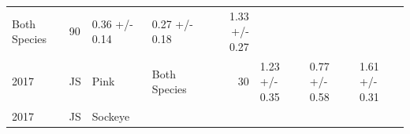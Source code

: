\documentclass[fleqn,10pt]{wlpeerj} %
\begin{document}
\begin{longtable}[]{@{}llllrlll@{}}
\begin{minipage}[t]{0.11\columnwidth}
Both Species\strut
\end{minipage} & \begin{minipage}[t]{0.04\columnwidth}\raggedleft\strut
90\strut
\end{minipage} & \begin{minipage}[t]{0.14\columnwidth}\raggedright\strut
0.36 +/- 0.14\strut
\end{minipage} & \begin{minipage}[t]{0.14\columnwidth}\raggedright\strut
0.27 +/- 0.18\strut
\end{minipage} & \begin{minipage}[t]{0.14\columnwidth}\raggedright\strut
1.33 +/- 0.27\strut
\end{minipage}\tabularnewline
\begin{minipage}[t]{0.09\columnwidth}\raggedright\strut
2017\strut
\end{minipage} & \begin{minipage}[t]{0.06\columnwidth}\raggedright\strut
JS\strut
\end{minipage} & \begin{minipage}[t]{0.06\columnwidth}\raggedright\strut
Pink\strut
\end{minipage} & \begin{minipage}[t]{0.11\columnwidth}\raggedright\strut
Both Species\strut
\end{minipage} & \begin{minipage}[t]{0.04\columnwidth}\raggedleft\strut
30\strut
\end{minipage} & \begin{minipage}[t]{0.14\columnwidth}\raggedright\strut
1.23 +/- 0.35\strut
\end{minipage} & \begin{minipage}[t]{0.14\columnwidth}\raggedright\strut
0.77 +/- 0.58\strut
\end{minipage} & \begin{minipage}[t]{0.14\columnwidth}\raggedright\strut
1.61 +/- 0.31\strut
\end{minipage}\tabularnewline
\begin{minipage}[t]{0.09\columnwidth}\raggedright\strut
2017\strut
\end{minipage} & \begin{minipage}[t]{0.06\columnwidth}\raggedright\strut
JS\strut
\end{minipage} & \begin{minipage}[t]{0.06\columnwidth}\raggedright\strut
Sockeye\strut
\end{minipage} & \begin{minipage}[t]{0.11\columnwidth}\raggedright\strut

\end{minipage}
\end{longtable}
\end{document}
